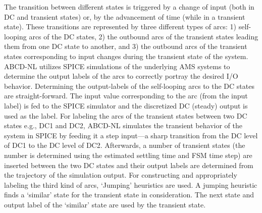 \documentclass[a4paper]{article}
\begin{document}
The transition between different states is triggered by a change of input (both in DC and transient states) or, by the advancement of time (while in a transient state). These transitions are represented by three different types of arcs: 1) self-looping arcs of the DC states, 2) the outbound arcs of the transient states leading them from one DC state to another, and 3) the outbound arcs of the transient states corresponding to input changes during the transient state of the system. ABCD-NL utilizes SPICE simulations of the underlying AMS systems to determine the output labels of the arcs to correctly portray the desired I/O behavior.  Determining the output-labels of the self-looping arcs to the DC states are straight-forward. The input value corresponding to the arc (from the input label) is fed to the SPICE simulator and the discretized DC (steady) output is used as the label. For labeling the arcs of the transient states between two DC states e.g., DC1 and DC2, ABCD-NL simulates the transient behavior of the system in SPICE by feeding it a step input---a sharp transition from the DC level of DC1 to the DC level of DC2. Afterwards, a number of transient states (the number is determined using the estimated settling time and FSM time step) are inserted between the two DC states and their output labels are determined from the trajectory of the simulation output. For constructing and appropriately labeling the third kind of arcs, `Jumping' heuristics are used. A jumping heuristic finds a `similar' state for the transient state in consideration. The next state and output label of the `similar' state are used by the transient state. 

\end{document}
